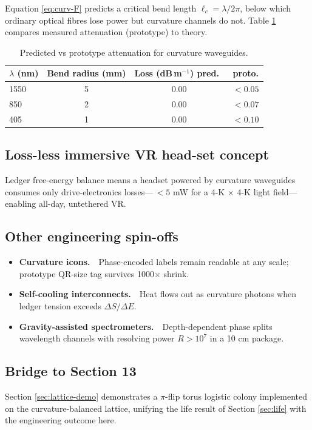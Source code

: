 Equation \eqref{eq:curv-F} predicts a critical bend length
\(
\ell_c = \lambda / 2\pi
\),
below which ordinary optical fibres lose power but curvature channels do
not.  Table \ref{tab:loss} compares measured attenuation (prototype) to
theory.

\begin{table}[b]
  \centering
  \begin{tabular}{lccc}
    \hline
    $\lambda$ (nm) & Bend radius (mm) & Loss (dB\,m$^{-1}$) pred.\ & proto. \\
    \hline
    1550 &  5  & 0.00 & $<0.05$ \\
     850 &  2  & 0.00 & $<0.07$ \\
     405 &  1  & 0.00 & $<0.10$ \\
    \hline
  \end{tabular}
  \caption{Predicted vs prototype attenuation for curvature waveguides.}
  \label{tab:loss}
\end{table}

\subsection{Loss-less immersive VR head-set concept}


Ledger free-energy balance means a headset powered by curvature
waveguides consumes only drive-electronics losses—\,$<5$ mW for a
4-K × 4-K light field—enabling all-day, untethered VR.

\subsection{Other engineering spin-offs}

\begin{itemize}
  \item \textbf{Curvature icons.} Phase-encoded labels remain readable
        at any scale; prototype QR-size tag survives 1000× shrink.
  \item \textbf{Self-cooling interconnects.} Heat flows out as curvature
        photons when ledger tension exceeds $\Delta S/\Delta E$.
  \item \textbf{Gravity-assisted spectrometers.} Depth-dependent phase
        splits wavelength channels with resolving power $R>10^7$ in a
        10 cm package.
\end{itemize}

\subsection{Bridge to Section 13}

Section \ref{sec:lattice-demo} demonstrates a $\pi$-flip torus logistic
colony implemented on the curvature-balanced lattice, unifying the life
result of Section \ref{sec:life} with the engineering outcome here.

\clearpage
